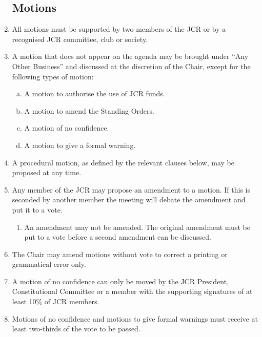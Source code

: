 \documentclass[12pt]{article}  %
\begin{document}
\begin{enumerate}
	\subsection{Motions}
	\item All motions must be supported by two members of the JCR or by a recognised JCR committee, club or society.
	\item A motion that does not appear on the agenda may be brought under “Any Other Business” and discussed at the discretion of the Chair, except for the following types of motion:
	\begin{enumerate}[(a)]
		\item A motion to authorise the use of JCR funds.
		\item A motion to amend the Standing Orders.
		\item A motion of no confidence.
		\item A motion to give a formal warning.
	\end{enumerate}
	\item A procedural motion, as defined by the relevant clauses below, may be proposed at any time.
	\item Any member of the JCR may propose an amendment to a motion. If this is seconded by another member the meeting will debate the amendment and put it to a vote.
	\begin{enumerate}
		\item An amendment may not be amended. The original amendment must be put to a vote before a second amendment can be discussed.
	\end{enumerate}
	\item The Chair may amend motions without vote to correct a printing or grammatical error only.
	\item A motion of no confidence can only be moved by the JCR President, Constitutional Committee or a member with the supporting signatures of at least 10\% of JCR members.
	\item Motions of no confidence and motions to give formal warnings must receive at least two-thirds of the vote to be passed.

\end{enumerate}
\end{document}
